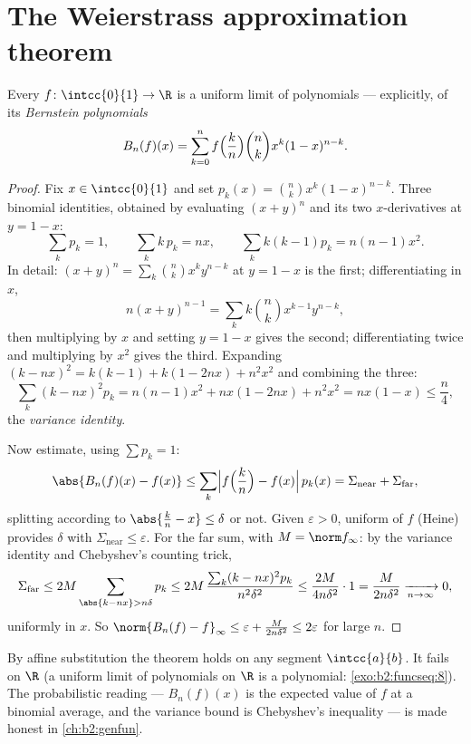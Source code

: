 \section{The Weierstrass approximation theorem}

\begin{theorem}\label{thm:b2:funcseq:weierstrass}
Every  $f \colon \intcc{0}{1} \to \R$ is a uniform limit
of polynomials --- explicitly, of its \emph{Bernstein
polynomials}
\[
B_n(f)(x) = \sum_{k=0}^{n} f\Bigl(\frac kn\Bigr)\binom nk x^k
(1-x)^{n-k} .
\]
\end{theorem}

\begin{proof}
Fix $x \in \intcc{0}{1}$ and set $p_k(x) = \binom nk x^k(1 -
x)^{n-k}$. Three binomial identities, obtained by evaluating
$(x + y)^n$ and its two $x$-derivatives at $y = 1 - x$:
\[
\sum_k p_k = 1,
\qquad
\sum_k k\,p_k = nx,
\qquad
\sum_k k(k-1) p_k = n(n-1)x^2 .
\]
In detail: $(x+y)^n = \sum_k\binom nk x^ky^{n-k}$ at $y = 1-x$
is the first; differentiating in $x$,
\[
n(x+y)^{n-1} = \sum_k k\binom nk x^{k-1}y^{n-k} ,
\]
then multiplying by $x$ and setting $y = 1 - x$ gives the
second; differentiating twice and multiplying by $x^2$ gives
the third. Expanding $(k - nx)^2 = k(k-1) + k(1 - 2nx) +
n^2x^2$ and combining the three:
\[
\sum_k (k - nx)^2 p_k
= n(n-1)x^2 + nx(1 - 2nx) + n^2x^2
= nx(1 - x) \leq \frac n4 ,
\]
the \emph{variance identity}.

Now estimate, using $\sum p_k = 1$:
\[
\abs{B_n(f)(x) - f(x)}
\leq \sum_{k} \Bigl| f\Bigl(\frac kn\Bigr) - f(x)\Bigr|\, p_k(x)
= \Sigma_{\text{near}} + \Sigma_{\text{far}} ,
\]
splitting according to $\abs{\frac kn - x} \leq \delta$ or not.
Given $\varepsilon > 0$, uniform  of $f$ (Heine) provides
$\delta$ with $\Sigma_{\text{near}} \leq \varepsilon$. For the far
sum, with $M = \norm f_\infty$: by the variance identity and
Chebyshev's counting trick,
\[
\Sigma_{\text{far}} \leq 2M \sum_{\abs{k - nx} > n\delta} p_k
\leq 2M\,\frac{\sum_k (k - nx)^2 p_k}{n^2\delta^2}
\leq \frac{2M}{4 n \delta^2} \cdot 1
= \frac{M}{2n\delta^2}
\xrightarrow[n\to\infty]{} 0 ,
\]
uniformly in $x$. So $\norm{B_n(f) - f}_\infty \leq \varepsilon +
\frac{M}{2n\delta^2} \leq 2\varepsilon$ for large $n$.
\end{proof}

\begin{remark}
By affine substitution the theorem holds on any segment
$\intcc{a}{b}$. It fails on $\R$ (a uniform limit of polynomials on
$\R$ is a polynomial: \cref{exo:b2:funcseq:8}). The probabilistic
reading --- $B_n(f)(x)$ is the expected value of $f$ at a binomial
average, and the variance bound is Chebyshev's inequality --- is
made honest in \cref{ch:b2:genfun}.
\end{remark}

